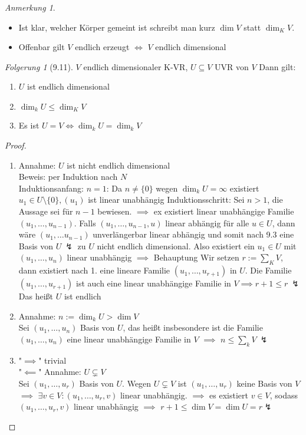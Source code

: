 \documentclass[a4paper]{scrartcl}
\DeclareMathOperator{\Exists}{\exists}
\theoremstyle{definition}
\theoremstyle{plain}
\theoremstyle{plain}
\theoremstyle{remark}
\theoremstyle{remark}
\newtheorem{note}{Anmerkung}
\theoremstyle{remark}
\newtheorem{conc}{Folgerung}
\theoremstyle{remark}
\theoremstyle{remark}
\begin{document}
\begin{note}
\begin{itemize}
\item Ist klar, welcher Körper gemeint ist schreibt man kurz $\dim V$ statt $\dim_K V$.
\item Offenbar gilt $V$ endlich erzeugt $\iff$ $V$ endlich dimensional
\end{itemize}
\end{note}
\begin{conc}[9.11]
$V$ endlich dimensionaler K-VR, $U\subseteq V$ UVR von $V$ Dann gilt:
\begin{enumerate}
\item $U$ ist endlich dimensional
\item $\dim_k U \leq \dim_K V$
\item Es ist $U = V \iff \dim_k U = \dim_k V$
\end{enumerate}
\end{conc}
\begin{proof}
\begin{enumerate}
\item Annahme: $U$ ist nicht endlich dimensional \\
         Beweis: per Induktion nach $N$ \\
         Induktionsanfang: $n = 1$: Da $n\neq \{0\}$ wegen $\dim_k U = \infty$ existiert $u_1 \in U \setminus \{0\}, (u_1)$ ist linear unabhängig
Induktionsschritt: Sei $n > 1$, die Aussage sei für $n - 1$ bewiesen. $\implies$ ex existiert linear unabhängige Familie $(u_1, \ldots, u_{n - 1})$.
Falls $(u_1, \ldots, u_{n - 1}, u)$ linear abhängig für alle $u \in U$, dann wäre $(u_1, \ldots u_{n - 1})$ unverlängerbar linear abhängig und somit nach 9.3 eine Basis von $U~\lightning$ zu $U$ nicht endlich dimensional.
Also existiert ein $u_1 \in U$ mit $(u_1, \ldots, u_n)$ linear unabhängig $\implies$ Behauptung
Wir setzen $r:= \sum_K V$, dann existiert nach 1. eine lineare Familie $(u_1, \ldots, u_{r + 1})$ in $U$. Die Familie $(u_1, \ldots, u_{r + 1})$ ist auch eine linear unabhängige Familie in $V \implies r + 1 \leq r ~ \lightning$ Das heißt $U$ ist endlich
\item Annahme: $n := \dim_k U > \dim V$ \\
         Sei $(u_1, \ldots, u_n)$ Basis von $U$, das heißt insbesondere ist die Familie $(u_1, \ldots, u_n)$ eine linear unabhängige Familie in $V$ $\implies$ $n \leq \sum_k V ~\lightning$
\item "$\implies$" trivial \\
         "$\impliedby$" Annahme: $U \subsetneq V$ \\
         Sei $(u_1, \ldots, u_r)$ Basis von $U$. Wegen $U \subsetneq V$ ist $(u_1, \ldots, u_r)$ keine Basis von $V$ $\implies$ $\Exists v\in V: (u_1, \ldots, u_r, v)$ linear unabhängig.
$\implies$ es existiert $v \in V$, sodass $(u_1, \ldots, u_r, v)$ linear unabhängig $\implies$ $r + 1 \leq \dim V = \dim U = r \lightning$
\end{enumerate}
\end{proof}
\end{document}
